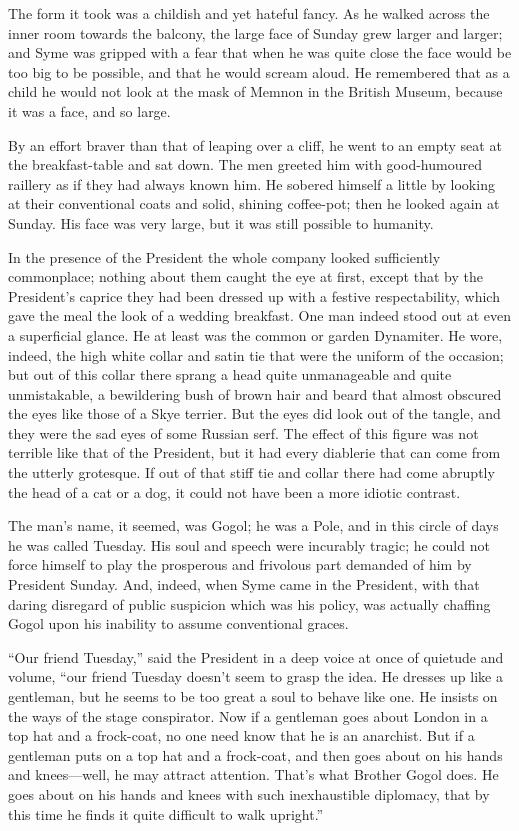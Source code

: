 \documentclass{book}
\begin{document}
The form it took was a childish and yet hateful fancy. As he walked across the inner room towards the balcony, the large face of Sunday grew larger and larger; and Syme was gripped with a fear that when he was quite close the face would be too big to be possible, and that he would scream aloud. He remembered that as a child he would not look at the mask of Memnon in the British Museum, because it was a face, and so large.

By an effort braver than that of leaping over a cliff, he went to an empty seat at the breakfast-table and sat down. The men greeted him with good-humoured raillery as if they had always known him. He sobered himself a little by looking at their conventional coats and solid, shining coffee-pot; then he looked again at Sunday. His face was very large, but it was still possible to humanity.

In the presence of the President the whole company looked sufficiently commonplace; nothing about them caught the eye at first, except that by the President’s caprice they had been dressed up with a festive respectability, which gave the meal the look of a wedding breakfast. One man indeed stood out at even a superficial glance. He at least was the common or garden Dynamiter. He wore, indeed, the high white collar and satin tie that were the uniform of the occasion; but out of this collar there sprang a head quite unmanageable and quite unmistakable, a bewildering bush of brown hair and beard that almost obscured the eyes like those of a Skye terrier. But the eyes did look out of the tangle, and they were the sad eyes of some Russian serf. The effect of this figure was not terrible like that of the President, but it had every diablerie that can come from the utterly grotesque. If out of that stiff tie and collar there had come abruptly the head of a cat or a dog, it could not have been a more idiotic contrast.

The man’s name, it seemed, was Gogol; he was a Pole, and in this circle of days he was called Tuesday. His soul and speech were incurably tragic; he could not force himself to play the prosperous and frivolous part demanded of him by President Sunday. And, indeed, when Syme came in the President, with that daring disregard of public suspicion which was his policy, was actually chaffing Gogol upon his inability to assume conventional graces.

“Our friend Tuesday,” said the President in a deep voice at once of quietude and volume, “our friend Tuesday doesn’t seem to grasp the idea. He dresses up like a gentleman, but he seems to be too great a soul to behave like one. He insists on the ways of the stage conspirator. Now if a gentleman goes about London in a top hat and a frock-coat, no one need know that he is an anarchist. But if a gentleman puts on a top hat and a frock-coat, and then goes about on his hands and knees—well, he may attract attention. That’s what Brother Gogol does. He goes about on his hands and knees with such inexhaustible diplomacy, that by this time he finds it quite difficult to walk upright.”
\end{document}
